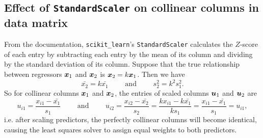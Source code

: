 \documentclass[12pt]{article}
\begin{document}
	\subsection{Effect of \texttt{StandardScaler} on collinear columns in data matrix \label{sec:append4}}
	From the documentation, \texttt{scikit\_learn}'s \texttt{StandardScaler} calculates the $Z$-score of each entry by subtracting each entry by the mean of its column and dividing by the standard deviation of its column. Suppose that the true relationship between regressors $\boldsymbol{x}_1$ and $\boldsymbol{x}_2$ is $\boldsymbol{x}_2=k\boldsymbol{x}_1$. Then we have
	$$\bar{x_2}=k\bar{x_1}\quad \quad \text{ and }\quad \quad s^2_2=k^2s_1^2.$$
	So for collinear columns $\boldsymbol{x}_1$ and $\boldsymbol{x}_2$, the entries of scaled columns $\boldsymbol{u}_1$ and $\boldsymbol{u}_2$ are
	$$u_{i1}=\frac{x_{i1}-\bar{x_1}}{s_1}\quad\quad\text{ and }\quad \quad u_{i2}=\frac{x_{i2}-\bar{x_2}}{s_2}=\frac{kx_{i1}-k\bar{x_1}}{ks_1}=\frac{x_{i1}-\bar{x_1}}{s_1}=u_{i1},$$
	i.e. after scaling predictors, the perfectly collinear columns will become identical, causing the least squares solver to assign equal weights to both predictors.
	\pagebreak
	
	
\end{document}
